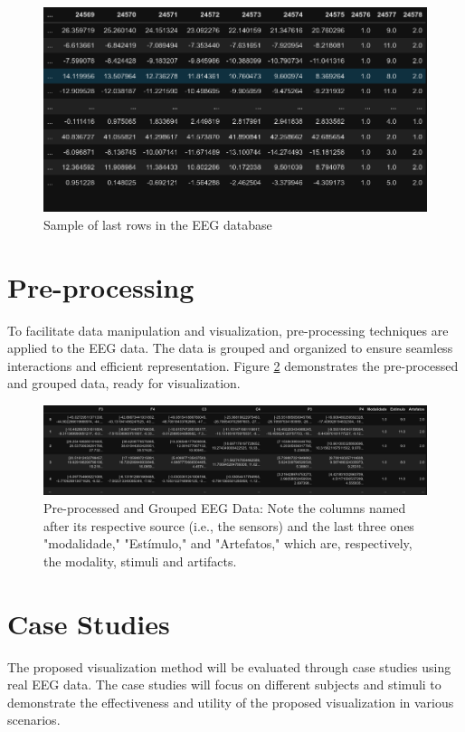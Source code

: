 \documentclass[format=sigconf]{acmart}
\begin{document}
		\begin{figure}[h]
			\centering
			\includegraphics[width=.9\linewidth]{../presentation/images/visu05}
			\caption{Sample of last rows in the EEG database}
			\label{fig:visu05}
		\end{figure}
	
	\section{Pre-processing}
		\par To facilitate data manipulation and visualization, pre-processing techniques are applied to the EEG data. The data is grouped and organized to ensure seamless interactions and efficient representation. Figure \ref{fig:visu06} demonstrates the pre-processed and grouped data, ready for visualization.
	
		\begin{figure}[h]
			\centering
			\includegraphics[width=\linewidth]{../presentation/images/visu06}
			\caption{Pre-processed and Grouped EEG Data: Note the columns named after its respective source (i.e., the sensors) and the last three ones "modalidade," "Estímulo," and "Artefatos," which are, respectively, the modality, stimuli and artifacts.}
			\label{fig:visu06}
		\end{figure}
	
	\section{Case Studies}
		\par The proposed visualization method will be evaluated through case studies using real EEG data. The case studies will focus on different subjects and stimuli to demonstrate the effectiveness and utility of the proposed visualization in various scenarios.
	
\end{document}
